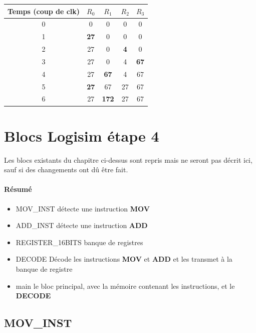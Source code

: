 \documentclass[a4paper]{article} %
\begin{document}
\begin{tabular}{|c|c|c|c|c|}    
    \hline
    Temps (coup de clk) & $R_0$ & $R_1$          & $R_2$          & $R_3$ \\
    \hline
    0                   & 0     & 0              & 0              & 0 \\
    \hline
    1                   & \textbf{27}            & 0     & 0     & 0   \\
    \hline
    2                   & 27    & 0              & \textbf{4}     & 0 \\
    \hline
    3                   & 27    & 0              & 4              & \textbf{67}  \\
    \hline
    4                   & 27    & \textbf{67}    & 4     & 67\\
    \hline
    5                   & \textbf{27}    & 67    & 27    & 67 \\
    \hline
    6                   & 27    & \textbf{172}    & 27    & 67\\
    \hline
\end{tabular}

    
    
\section{Blocs Logisim étape 4}
Les blocs existants du chapitre ci-dessus sont repris mais ne seront pas décrit ici, sauf si des changements ont dû être fait.
\paragraph{Résumé}
\begin{itemize}
    \item     MOV\_INST détecte une instruction \textbf{MOV}
    \item     ADD\_INST détecte une instruction \textbf{ADD}
    \item     REGISTER\_16BITS banque de registres
    \item     DECODE Décode les instructions \textbf{MOV} et \textbf{ADD} et les transmet à la banque de registre
    \item     main le bloc principal, avec la mémoire contenant les instructions, et le \textbf{DECODE}
\end{itemize}

\subsection{MOV\_INST}
\end{document}
